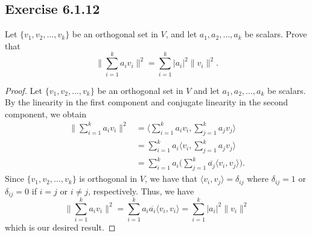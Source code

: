 \subsection*{Exercise 6.1.12} Let \( \{ {v}_{1}, {v}_{2}, \dots, {v}_{k} \}  \) be an orthogonal set in \( V  \), and let \( {a}_{1}, {a}_{2}, \dots, {a}_{k }  \) be scalars. Prove that
\[  \Big\| \sum_{ i=1 }^{ k  } {a}_{i} {v}_{i} \Big\|^{2} = \sum_{ i=1 }^{ k  } | {a}_{i} |^{2} \|{v}_{i}\|^{2}. \]
\begin{proof}
Let \( \{ {v}_{1}, {v}_{2}, \dots, {v}_{k } \}  \) be an orthogonal set in \( V  \) and let \( {a}_{1}, {a}_{2}, \dots, {a}_{k} \) be scalars. By the linearity in the first component and conjugate linearity in the second component, we obtain
\begin{align*}
    \Big\| \sum_{ i=1  }^{ k   } {a}_{i} {v}_{i} \Big\|^{2} &= \Big\langle \sum_{ i=1  }^{ k  } {a}_{i} {v}_{i}  ,  \sum_{ j=1  }^{ k  } {a}_{j} {v}_{j} \Big\rangle \\
                                                        &= \sum_{ i=1  }^{ k  } {a}_{i} \Big\langle  {v}_{i}  , \sum_{ j=1  }^{ k  } {a}_{j} {v}_{j}  \Big \rangle \\
                                                        &= \sum_{ i=1  }^{ k   } {a}_{i} \Big(  \sum_{ j=1  }^{ k  } \overline{{a}_{j}} \langle {v}_{i} ,  {v}_{j} \rangle   \Big).
\end{align*}
Since \( \{ {v}_{1}, {v}_{2}, \dots, {v}_{k } \}   \) is orthogonal in \( V  \), we have that \( \langle {v}_{i} , {v}_{j} \rangle = {\delta}_{ij} \) where \( {\delta}_{ij} = 1  \) or \( {\delta}_{ij} = 0   \) if \( i = j  \) or \( i \neq j  \), respectively. Thus, we have
\[  \Big\| \sum_{ i=1  }^{ k   } {a}_{i} {v}_{i} \Big\|^{2} = \sum_{ i=1  }^{ k  } {a}_{i} \overline{{a}_{i}} \langle {v}_{i}  , {v}_{i} \rangle = \sum_{ i=1  }^{ k  } | {a}_{i} | ^{2} \|{v}_{i}\|^{2}  \] which is our desired result.
\end{proof}

